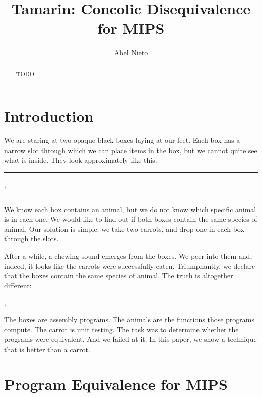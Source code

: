 \documentclass{llncs}
\title{Tamarin: Concolic Disequivalence for MIPS}
\author{Abel Nieto}
\institute{
University of Waterloo\\
\email{anietoro@uwaterloo.ca}
}
\newcommand{\crule}[3][black]{\textcolor{#1}{\rule{#2}{#3}}}
\begin{document}
\maketitle

\begin{abstract}
TODO
\end{abstract}

\section{Introduction}

We are staring at two opaque black boxes laying at our feet. Each box has a narrow slot through which we can place items in the box, but we cannot quite see what is inside. They look approximately like this:

\vspace{1mm}
\crule{1.5cm}{1.5cm}, \crule{1.5cm}{1.5cm}
\vspace{1mm}

We know each box contains an animal, but we do not know which specific animal is in each one. We would like to find out if both boxes contain the same species of animal. Our solution is simple: we take two carrots, and drop one in each box through the slots.

After a while, a chewing sound emerges from the boxes. We peer into them and, indeed, it looks like the carrots were successfully eaten. Triumphantly, we declare that the boxes contain the same species of animal. The truth is altogether different:

\vspace{1mm}
, 
\vspace{1mm}

The boxes are assembly programs. The animals are the functions those programs compute. The carrot is unit testing. The task was to determine whether the programs were equivalent. And we failed at it. In this paper, we show a technique that is better than a carrot.

\section{Program Equivalence for MIPS}
\label{progequiv}
\end{document}
